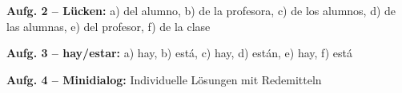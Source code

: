 \documentclass[11pt,a4paper]{article}
\begin{document}
\vspace{0.2cm}

\textbf{Aufg. 2 -- Lücken:}
a) del alumno, b) de la profesora, c) de los alumnos, d) de las alumnas, e) del profesor, f) de la clase

\vspace{0.2cm}

\textbf{Aufg. 3 -- hay/estar:}
a) hay, b) está, c) hay, d) están, e) hay, f) está

\vspace{0.2cm}

\textbf{Aufg. 4 -- Minidialog:} Individuelle Lösungen mit Redemitteln

\vspace{0.5cm}
\end{document}

